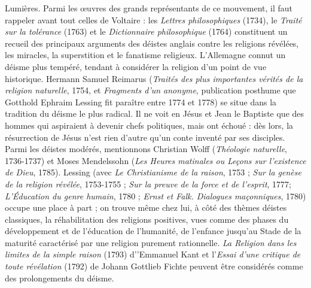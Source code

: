 Lumières. Parmi les œuvres des grands
représentants de ce mouvement, il faut
rappeler avant tout celles de Voltaire : les
%
{\it Lettres philosophiques} (1734), le {\it Traité
sur la tolérance} (1763) et le {\it Dictionnaire
philosophique} (1764) constituent un
recueil des principaux arguments des
déistes anglais contre les religions révélées,
les miracles, la superstition et le
fanatisme religieux. L'Allemagne connut
un déisme plus tempéré, tendant à considérer
la religion d’un point de vue historique.
Hermann Samuel Reimarus ({\it Traités des
plus importantes vérités de la religion
naturelle}, 1754, et {\it Fragments d’un anonyme},
publication posthume que Gotthold
Ephraim Lessing fit paraître entre
1774 et 1778) se situe dans la tradition du
déisme le plus radical. Il ne voit en Jésus
et Jean le Baptiste que des hommes qui
aspiraient à devenir chefs politiques, mais
ont échoué : dès lors, la résurrection de
Jésus n’est rien d’autre qu’un conte
inventé par ses disciples. Parmi les déistes
modérés, mentionnons Christian Wolff
({\it Théologie naturelle}, 1736-1737) et Moses
Mendelssohn ({\it Les Heures matinales ou
Leçons sur l'existence de Dieu}, 1785). Lessing
(avec {\it Le Christianisme de la raison},
1753 ; {\it Sur la genèse de la religion révélée},
1753-1755 ; {\it Sur la preuve de la force et de
l'esprit}, 1777; {\it L'Éducation du genre
humain}, 1780 ; {\it Ernst et Falk. Dialogues
maçonniques}, 1780) occupe une place à
part ; on trouve même chez lui, à côté des
thèmes déistes classiques, la réhabilitation
des religions positives, vues comme des
phases du développement et de l’éducation
de l'humanité, de l’enfance jusqu’au
Stade de la maturité caractérisé par une
religion purement rationnelle. {\it La Religion
dans les limites de la simple raison}
(1793) d’'Emmanuel Kant et l’{\it Essai d’une
critique de toute révélation} (1792) de
Johann Gottlieb Fichte peuvent être
considérés comme des prolongements du
déisme.


